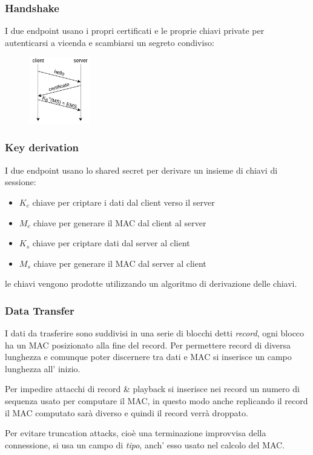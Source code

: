 \subsubsection{Handshake}
I due endpoint usano i propri certificati e le proprie chiavi private per autenticarsi a vicenda e scambiarsi un segreto condiviso:
\begin{figure}[H]
    \centering
    \includegraphics[width=100px]{images/7_Security/ssl_handshake.png}
\end{figure}

\subsubsection{Key derivation}
I due endpoint usano lo shared secret per derivare un insieme di chiavi di sessione:
\begin{itemize}
    \item $K_c$ chiave per criptare i dati dal client verso il server
    \item $M_c$ chiave per generare il MAC dal client al server
    \item $K_s$ chiave per criptare dati dal server al client
    \item $M_s$ chiave per generare il MAC dal server al client
\end{itemize}
le chiavi vengono prodotte utilizzando un algoritmo di derivazione delle chiavi.

\subsubsection{Data Transfer}
I dati da trasferire sono suddivisi in una serie di blocchi detti \emph{record}, ogni blocco ha un MAC posizionato alla fine del record.
Per permettere record di diversa lunghezza e comunque poter discernere tra dati e MAC si inserisce un campo lunghezza all' inizio.

Per impedire attacchi di record \& playback si inserisce nei record un numero di sequenza usato per computare il MAC, in questo modo anche replicando il record il MAC computato sarà diverso e quindi il record verrà droppato.

Per evitare truncation attacks, cioè una terminazione improvvisa della connessione, si usa un campo di \emph{tipo}, anch' esso usato nel calcolo del MAC.

